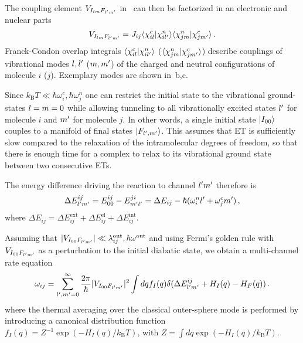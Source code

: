 The coupling element $V_{I_{lm}F_{l'm'}}$ in~ can then be factorized in an electronic and nuclear parts 
\begin{equation}
V_{I_{lm}F_{l'm'}}=J_{ij} \langle \chi_{il}^c |\chi_{il'}^n \rangle \langle \chi_{jm}^n |\chi_{jm'}^c \rangle\,.
\end{equation}
Franck-Condon overlap integrals $\langle \chi_{il}^c |\chi_{il'}^n \rangle$ ($\langle \chi_{jm}^n |\chi_{jm'}^c \rangle $) describe couplings of vibrational modes $l,l'$ ($m,m'$) of the charged and neutral configurations of molecule $i$  ($j$). Exemplary modes are shown in~b,c.

Since $k_\text{B}T\ll \hbar\omega_i^{c},\hbar\omega_j^{n}$ one can restrict the initial state to the vibrational ground-states $l=m=0$ while allowing tunneling to all vibrationally excited states $l'$ for molecule $i$ and $m'$ for molecule $j$. In other words, a single initial state $| I_{00} \rangle$ couples to a manifold of final states $| F_{l',m'} \rangle$. 
%
This assumes that ET is sufficiently slow compared to the relaxation of the intramolecular degrees of freedom, so that there is enough time for a complex to relax to its vibrational ground state between two consecutive ETs. 

The energy difference driving the reaction to channel ${l'm'}$  therefore is
\begin{equation*}
 \Delta E^{ij}_{l'm'}= E^{ij}_{00}-E^{ji}_{m'l'}=\Delta E_{ij} - \hbar (\omega_i^nl'+\omega_j^cm')\,,
\end{equation*}
where $\Delta E_{ij}=\Delta E_{ij}^\text{ext}+\Delta E_{ij}^\text{el}+\Delta E^\text{int}_{ij}$.

Assuming that $|V_{I_{00}F_{l'm'}}|\ll\lambda_{ij}^\text{out},\hbar\omega^\text{out}$ and using Fermi's golden rule with $V_{I_{00}F_{l'm'}}$ as a perturbation to the initial diabatic state, we obtain a multi-channel rate equation
\begin{equation}
\omega_{ij}=\sum_{l',m'=0}^\infty \frac{2\pi}{\hbar}|V_{I_{00}F_{l'm'}}|^2 
\int dq f_I(q) \delta(\Delta E^{ij}_{l'm'} + H_I(q) -H_F(q))\, .
\end{equation}
where the thermal averaging over the classical outer-sphere mode is performed by introducing a  canonical distribution function  $f_I(q)=Z^{-1}\exp(-H_I(q)/k_\text{B}T)$, with $Z=\int{dq \exp(-H_I(q)/k_\text{B}T)}$.

